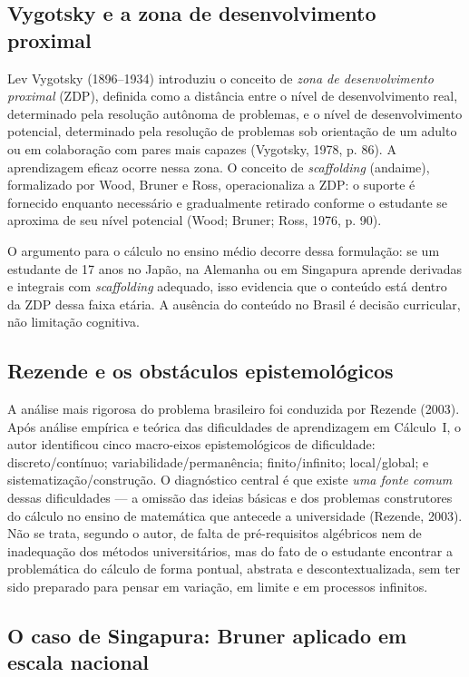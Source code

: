 \documentclass[12pt,a4paper,oneside]{article}
\begin{document}
\subsection{Vygotsky e a zona de desenvolvimento proximal}

Lev Vygotsky (1896--1934) introduziu o conceito de \emph{zona de
desenvolvimento proximal} (ZDP), definida como a distância entre o nível
de desenvolvimento real, determinado pela resolução autônoma de
problemas, e o nível de desenvolvimento potencial, determinado pela
resolução de problemas sob orientação de um adulto ou em colaboração com
pares mais capazes (Vygotsky, 1978, p. 86). A aprendizagem eficaz ocorre
nessa zona. O conceito de \emph{scaffolding} (andaime), formalizado por
Wood, Bruner e Ross, operacionaliza a ZDP: o suporte é fornecido enquanto
necessário e gradualmente retirado conforme o estudante se aproxima de
seu nível potencial (Wood; Bruner; Ross, 1976, p. 90).

O argumento para o cálculo no ensino médio decorre dessa formulação: se
um estudante de 17 anos no Japão, na Alemanha ou em Singapura aprende
derivadas e integrais com \emph{scaffolding} adequado, isso evidencia que
o conteúdo está dentro da ZDP dessa faixa etária. A ausência do conteúdo
no Brasil é decisão curricular, não limitação cognitiva.

\subsection{Rezende e os obstáculos epistemológicos}

A análise mais rigorosa do problema brasileiro foi conduzida por Rezende
(2003). Após análise empírica e teórica das dificuldades de aprendizagem
em Cálculo~I, o autor identificou cinco macro-eixos epistemológicos de
dificuldade: discreto/contínuo; variabilidade/permanência;
finito/infinito; local/global; e sistematização/construção. O diagnóstico
central é que existe \emph{uma fonte comum} dessas dificuldades --- a
omissão das ideias básicas e dos problemas construtores do cálculo no
ensino de matemática que antecede a universidade (Rezende, 2003). Não se
trata, segundo o autor, de falta de pré-requisitos algébricos nem de
inadequação dos métodos universitários, mas do fato de o estudante
encontrar a problemática do cálculo de forma pontual, abstrata e
descontextualizada, sem ter sido preparado para pensar em variação, em
limite e em processos infinitos.

\subsection{O caso de Singapura: Bruner aplicado em escala nacional}
\label{sec:singapura}
\end{document}
